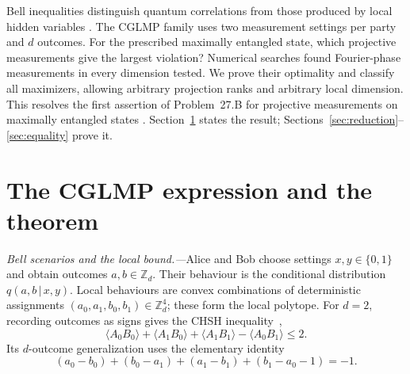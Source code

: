 \documentclass[aps,prl,reprint,superscriptaddress,longbibliography,floatfix,raggedbottom]{revtex4-2}
\newcommand{\Z}{\mathbb Z}
\begin{document}
Bell inequalities distinguish quantum correlations from those produced
by local hidden variables \cite{Bell,CHSH,Brunner}. The CGLMP family
\cite{CGLMP} uses two measurement settings per party and $d$ outcomes.
For the prescribed maximally entangled state, which projective
measurements give the largest violation? Numerical searches
\cite{KGZMZ,DKZ} found Fourier-phase measurements in every dimension
tested. We prove their optimality and classify all maximizers, allowing
arbitrary projection ranks and arbitrary local dimension. This resolves
the first assertion of Problem~27.B for projective measurements on
maximally entangled states \cite{GillProblem,KruegerWerner}.
Section~\ref{sec:statement} states the result;
Sections~\ref{sec:reduction}--\ref{sec:equality} prove it.

\section{\texorpdfstring{The CGLMP expression and the theorem}{The CGLMP expression and the theorem}}\label{sec:statement}

\emph{Bell scenarios and the local bound.---}Alice and Bob choose
settings $x,y\in\{0,1\}$ and obtain outcomes $a,b\in\Z_d$. Their
behaviour is the conditional distribution $q(a,b\,|\,x,y)$. Local
behaviours are convex combinations of deterministic assignments
$(a_0,a_1,b_0,b_1)\in\Z_d^4$; these form the local polytope.
For $d=2$, recording outcomes as signs gives the CHSH inequality~\cite{CHSH},
\begin{equation}\label{eq:chsh}
\langle A_0B_0\rangle+\langle A_1B_0\rangle
+\langle A_1B_1\rangle-\langle A_0B_1\rangle\le2.
\end{equation}
Its $d$-outcome generalization uses the elementary identity
\begin{equation}\label{eq:parity}
(a_0-b_0)+(b_0-a_1)+(a_1-b_1)+(b_1-a_0-1)=-1.
\end{equation}
\end{document}
